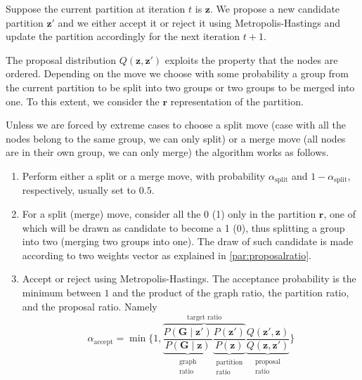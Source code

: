Suppose the current partition at iteration $t$ is $\bm{z}$.
We propose a new candidate partition $\bm{z}'$ and we either accept it or reject it using Metropolis-Hastings and update the partition accordingly for the next iteration $t+1$.

The proposal distribution $Q(\bm{z},\bm{z}')$ exploits the property that the nodes are ordered.
Depending on the move we choose with some probability a group from the current partition to be split into two groups or two groups to be merged into one.
To this extent, we consider the $\bm{r}$ representation of the partition.

Unless we are forced by extreme cases to choose a split move (case with all the nodes belong to the same group, we can only split) or a merge move (all nodes are in their own group, we can only merge) the algorithm works as follows.

\begin{enumerate}
    \item Perform either a split or a merge move, with probability $\alpha_{\text{split}}$ and $1-\alpha_{\text{split}}$, respectively, usually set to $0.5$.
    \item For a split (merge) move, consider all the \num{0} (\num{1}) only in the partition $\bm{r}$, one of which will be drawn as candidate to become a \num{1} (\num{0}), thus splitting a group into two (merging two groups into one).
    The draw of such candidate is made according to two weights vector as explained in \ref{par:proposalratio}.
    \item Accept or reject using Metropolis-Hastings.
    The acceptance probability is the minimum between $1$ and the product of the graph ratio, the partition ratio, and the proposal ratio. Namely
    \begin{equation}
        \alpha_{\text{accept}} = \min
       \bigg\{1,
       \overbrace{
       \underbrace{\frac{P(\bm{G} \mid \bm{z}')}{P(\bm{G} \mid \bm{z})}}_{\substack{\text{graph}\\\text{ratio}}}
       \underbrace{\frac{P(\bm{z}')}{P(\bm{z})}}_{\substack{\text{partition}\\\text{ratio}}}
       }^{\text{target ratio}}
       \underbrace{\frac{Q(\bm{z}',\bm{z})}{Q(\bm{z},\bm{z}')}}_{\substack{\text{proposal}\\\text{ratio}}}
       \bigg\}
       \label{eq:alphaaccept}
    \end{equation}
\end{enumerate}

